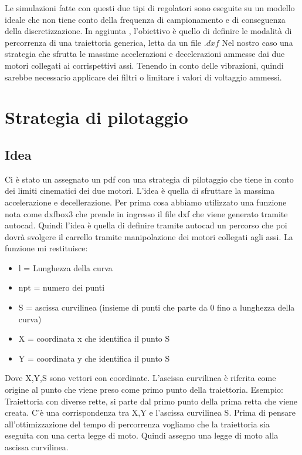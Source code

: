 \documentclass{article}
\begin{document}
Le simulazioni fatte con questi due tipi di regolatori sono eseguite su un modello ideale che non tiene conto della frequenza di campionamento e di conseguenza della discretizzazione. 
In aggiunta , l'obiettivo è quello di definire le modalità di percorrenza di una traiettoria generica, letta da un file $.dxf$ 
Nel nostro caso una strategia che sfrutta le massime accelerazioni e decelerazioni ammesse dai due motori collegati ai corrispettivi assi. Tenendo in conto delle vibrazioni, quindi sarebbe necessario applicare dei filtri o limitare i valori di voltaggio ammessi.

\section{Strategia di pilotaggio}
\subsection{Idea}
Ci è stato un assegnato un pdf con una strategia di pilotaggio che tiene in conto dei limiti cinematici dei due motori. L'idea è quella di sfruttare la massima accelerazione e decellerazione.
Per prima cosa abbiamo utilizzato una funzione nota come dxfbox3
che prende in ingresso il file dxf che viene generato tramite autocad.
Quindi l'idea è quella di definire tramite autocad un percorso che poi dovrà svolgere il carrello tramite manipolazione dei motori collegati agli assi. La funzione mi restituisce: 
\begin{itemize}
    \item l = Lunghezza della curva
    \item npt = numero dei punti
    \item S = ascissa curvilinea (insieme di punti che parte da 0 fino a lunghezza della curva)
    \item X = coordinata x che identifica il punto S
    \item Y = coordinata y che identifica il punto S
\end{itemize}
Dove X,Y,S sono vettori con coordinate. L'ascissa curvilinea è riferita come origine al punto che viene preso come primo punto della traiettoria.
Esempio: Traiettoria con diverse rette, si parte dal primo punto della prima retta che viene creata. C'è una corrispondenza tra X,Y e l'ascissa curvilinea S. Prima di pensare all'ottimizzazione del tempo di percorrenza vogliamo che la traiettoria sia eseguita con una certa legge di moto. Quindi assegno una legge di moto alla ascissa curvilinea.
\end{document}
